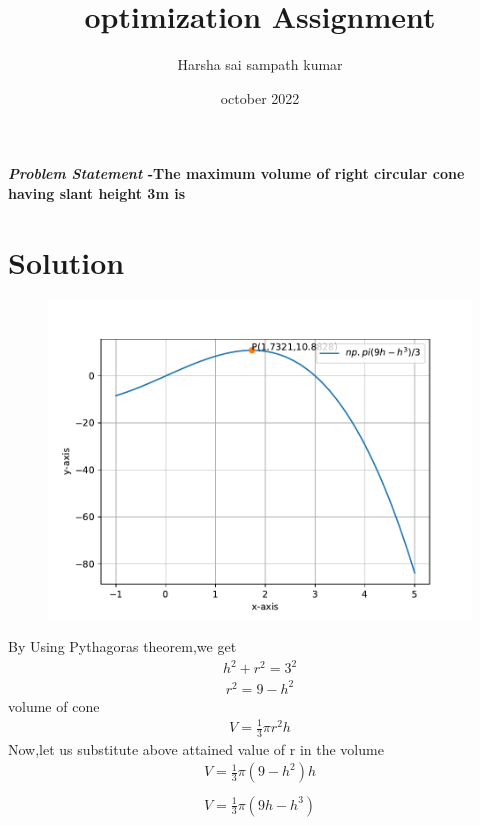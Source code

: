 \documentclass[journal,10pt,twocolumn]{article}
\title{\textbf{optimization Assignment}}
\author{Harsha sai sampath kumar}
\date{october 2022}
\begin{document}
\maketitle
\paragraph{\textit{\large Problem Statement} -The maximum volume of right circular cone having slant height 3m
 is}

\section*{\large Solution}

\begin{figure}[H]
\centering
\includegraphics[width=1\columnwidth]{fig}
\caption{}
\end{figure}

   
  
   By Using Pythagoras theorem,we get
\begin{eqnarray}
h^2+r^2=3^2
\end{eqnarray}
\begin{eqnarray}
r^2=9-h^2
\end{eqnarray}
 volume of cone
\begin{eqnarray} 
V=\frac{1}{3}\pi r^2h
\end{eqnarray}
 Now,let us substitute above attained value of r in the  volume
\\
\begin{eqnarray}
V=\frac{1}{3}\pi( 9-h^2)h\\
\end{eqnarray}
\begin{eqnarray}
V=\frac{1}{3}\pi( 9h-h^3)
\end{eqnarray}
\end{document}
